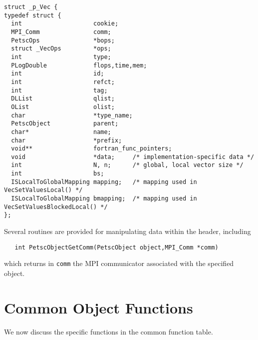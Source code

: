 \begin{verbatim}
struct _p_Vec {
typedef struct {
  int                    cookie;                                  
  MPI_Comm               comm;                                    
  PetscOps               *bops;                                   
  struct _VecOps         *ops;                                    
  int                    type;                                    
  PLogDouble             flops,time,mem;                          
  int                    id;                                      
  int                    refct;                                   
  int                    tag;                                     
  DLList                 qlist;                                   
  OList                  olist;                                   
  char                   *type_name;                              
  PetscObject            parent;                                  
  char*                  name;                                    
  char                   *prefix;                                 
  void**                 fortran_func_pointers;       
  void                   *data;     /* implementation-specific data */
  int                    N, n;      /* global, local vector size */
  int                    bs;
  ISLocalToGlobalMapping mapping;   /* mapping used in VecSetValuesLocal() */
  ISLocalToGlobalMapping bmapping;  /* mapping used in VecSetValuesBlockedLocal() */
};
\end{verbatim}

Several routines are provided for manipulating data within the header,
including
\begin{verbatim}
   int PetscObjectGetComm(PetscObject object,MPI_Comm *comm) 
\end{verbatim}
which returns in {\tt comm}  the MPI communicator associated with the
specified object.

\section{Common Object Functions}

We now discuss the specific functions in the common function table.

